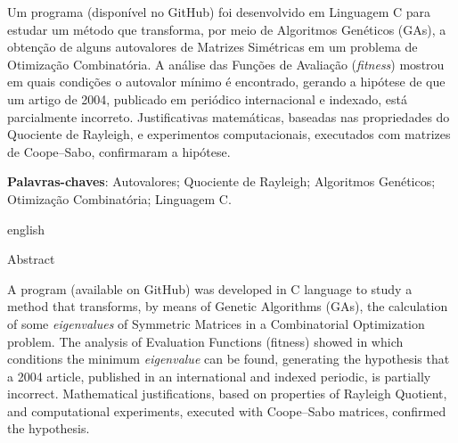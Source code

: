 

\thispagestyle{empty}
\begin{resumo}
Um programa (disponível no GitHub) foi desenvolvido em Linguagem C para estudar um método que transforma, por meio de Algoritmos Genéticos (GAs), a obtenção de alguns autovalores de Matrizes Simétricas em um problema de Otimização Combinatória. A análise das Funções de Avaliação (\emph{fitness}) mostrou em quais condições o autovalor mínimo é encontrado, gerando a hipótese de que um artigo de 2004, publicado em periódico internacional e indexado, está parcialmente incorreto. Justificativas matemáticas, baseadas nas propriedades do Quociente de Rayleigh, e experimentos computacionais, executados com matrizes de Coope--Sabo, confirmaram a hipótese.
     
    \vspace{\onelineskip}

    \noindent\textbf{Palavras-chaves}: Autovalores; Quociente de Rayleigh; Algoritmos Genéticos; Otimização Combinatória; Linguagem C.

    \vspace{\onelineskip}
    \vspace{\onelineskip}
		
    \begin{otherlanguage*}{english}
    \begin{center}{\ABNTEXchapterfont\huge Abstract}\end{center}
    
    A program (available on GitHub) was developed in C language to study a method that transforms, by means of Genetic Algorithms (GAs), the calculation of some \emph{eigenvalues} of Symmetric Matrices in a Combinatorial Optimization problem. The analysis of Evaluation Functions (fitness) showed in which conditions the minimum \emph{eigenvalue} can be found, generating the hypothesis that a 2004 article, published in an international and indexed periodic, is partially incorrect. Mathematical justifications, based on properties of Rayleigh Quotient, and computational experiments, executed with Coope--Sabo matrices, confirmed the hypothesis.
		

\end{otherlanguage*}
\end{resumo}
